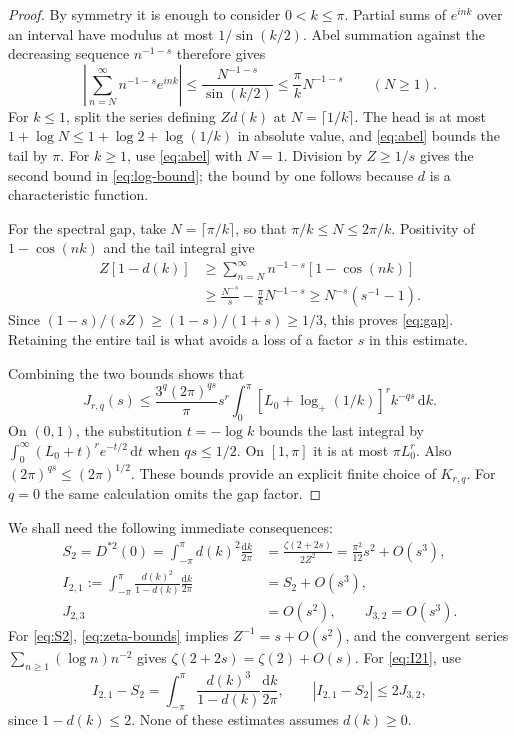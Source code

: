 \documentclass[11pt]{article}
\theoremstyle{definition}
\newcommand{\dd}{\,\mathrm d}
\newcommand{\intk}{\int_{-\pi}^{\pi}}
\newcommand{\dm}{\frac{\mathrm dk}{2\pi}}
\begin{document}
\begin{proof}
By symmetry it is enough to consider $0<k\le\pi$. Partial sums of
$e^{ink}$ over an interval have modulus at most $1/\sin(k/2)$. Abel
summation against the decreasing sequence $n^{-1-s}$ therefore gives
\begin{equation}\label{eq:abel}
 \left|\sum_{n=N}^\infty n^{-1-s}e^{ink}\right|
 \le\frac{N^{-1-s}}{\sin(k/2)}
 \le\frac{\pi}{k}N^{-1-s}\qquad(N\ge1).
\end{equation}
For $k\le1$, split the series defining $Zd(k)$ at $N=\lceil1/k\rceil$.
The head is at most $1+\log N\le1+\log2+\log(1/k)$ in absolute value,
and \eqref{eq:abel} bounds the tail by $\pi$. For $k\ge1$, use
\eqref{eq:abel} with $N=1$. Division by $Z\ge1/s$ gives the second
bound in \eqref{eq:log-bound}; the bound by one follows because $d$ is
a characteristic function.

For the spectral gap, take $N=\lceil\pi/k\rceil$, so that
$\pi/k\le N\le2\pi/k$. Positivity of $1-\cos(nk)$ and the tail integral
give
\begin{align*}
 Z[1-d(k)]
 &\ge\sum_{n=N}^\infty n^{-1-s}[1-\cos(nk)]\\
 &\ge \frac{N^{-s}}s-\frac{\pi}{k}N^{-1-s}
 \ge N^{-s}(s^{-1}-1).
\end{align*}
Since $(1-s)/(sZ)\ge(1-s)/(1+s)\ge1/3$, this proves
\eqref{eq:gap}. Retaining the entire tail is what avoids a loss of a
factor $s$ in this estimate.

Combining the two bounds shows that
\[
 J_{r,q}(s)\le
 \frac{3^q(2\pi)^{qs}}{\pi}s^r
 \int_0^\pi[L_0+\log_+(1/k)]^r k^{-qs}\dd k.
\]
On $(0,1)$, the substitution $t=-\log k$ bounds the last integral by
$\int_0^\infty(L_0+t)^r e^{-t/2}\dd t$ when $qs\le1/2$. On $[1,\pi]$
it is at most $\pi L_0^r$. Also $(2\pi)^{qs}\le(2\pi)^{1/2}$.
These bounds provide an explicit finite choice of $K_{r,q}$.
For $q=0$ the same calculation omits the gap factor.
\end{proof}

We shall need the following immediate consequences:
\begin{align}
 S_2=D^{*2}(0)=\intk d(k)^2\dm
 &=\frac{\zeta(2+2s)}{2Z^2}
   =\frac{\pi^2}{12}s^2+O(s^3),\label{eq:S2}\\
 I_{2,1}:=\intk\frac{d(k)^2}{1-d(k)}\dm
 &=S_2+O(s^3),\label{eq:I21}\\
 J_{2,3}&=O(s^2),\qquad J_{3,2}=O(s^3).\label{eq:needed-J}
\end{align}
For \eqref{eq:S2}, \eqref{eq:zeta-bounds} implies $Z^{-1}=s+O(s^2)$,
and the convergent series $\sum_{n\ge1}(\log n)n^{-2}$ gives
$\zeta(2+2s)=\zeta(2)+O(s)$. For \eqref{eq:I21}, use
\[
 I_{2,1}-S_2=\intk\frac{d(k)^3}{1-d(k)}\dm,
 \qquad |I_{2,1}-S_2|\le2J_{3,2},
\]
since $1-d(k)\le2$. None of these estimates assumes $d(k)\ge0$.
\end{document}

